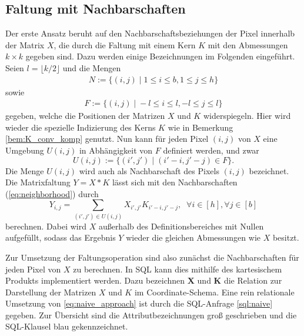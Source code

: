\subsection{Faltung mit Nachbarschaften}
\label{abs:naive_app}
Der erste Ansatz beruht auf den Nachbarschaftsbeziehungen der Pixel innerhalb der Matrix $X$, die durch die Faltung mit einem Kern $K$ mit den Abmessungen $k \times k$ gegeben sind. Dazu werden einige Bezeichnungen im Folgenden eingeführt. Seien $l=\lfloor k/2 \rfloor$ und die Mengen
\begin{align*}
    N:=\{(i,j) \; |\; 1 \leq i \leq b, 1 \leq j \leq h \}
\end{align*} 
sowie
\begin{align*}
    F:=\{(i,j) \; |\; -l \leq i \leq l, -l \leq j \leq l \}
\end{align*} 
gegeben, welche die Positionen der Matrizen $X$ und $K$ widerspiegeln. Hier wird wieder die spezielle Indizierung des Kerns $K$ wie in Bemerkung \ref{bem:K_conv_komp} genutzt. Nun kann für jeden Pixel $(i,j)$ von $X$ eine Umgebung $U(i,j)$  in Abhängigkeit von $F$ definiert werden, und zwar
\begin{equation}
    \label{eq:neighborhood}
    U(i,j):=\{(i', j') \; | \; (i'-i, j'-j) \in F \}.
\end{equation}
Die Menge $U(i,j)$ wird auch als Nachbarschaft des Pixels $(i,j)$ bezeichnet.
Die Matrixfaltung $Y= X \ast K$ lässt sich mit den Nachbarschaften (\ref{eq:neighborhood}) durch
\begin{equation}
    \label{eq:naive_approach}
    Y_{i,j}=\sum_{(i',j') \in U(i,j)} X_{i', j'} K_{i'-i, j'-j}, \; \; \forall i \in [h], \forall j \in [b]
\end{equation}
berechnen. Dabei wird $X$ außerhalb des Definitionsbereiches mit Nullen aufgefüllt, sodass das Ergebnis $Y$ wieder die gleichen Abmessungen wie $X$ besitzt.

Zur Umsetzung der Faltungsoperation sind also zunächst die Nachbarschaften für jeden Pixel von $X$ zu berechnen. In SQL kann dies mithilfe des kartesischem Produkts implementiert werden. Dazu bezeichnen $\mathbf{X}$ und $\mathbf{K}$ die Relation zur Darstellung der Matrizen $X$ und $K$ im Coordinate-Schema. Eine rein relationale Umsetzung von \ref{eq:naive_approach} ist durch die SQL-Anfrage \ref{sql:naive} gegeben. Zur Übersicht sind die Attributbezeichnungen groß geschrieben und die SQL-Klausel blau gekennzeichnet. 



